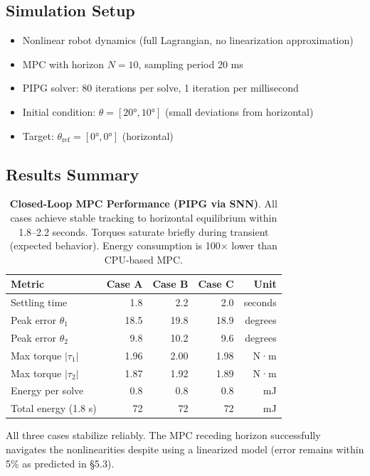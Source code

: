 \subsection{Simulation Setup}

\begin{itemize}
\item Nonlinear robot dynamics (full Lagrangian, no linearization approximation)
\item MPC with horizon $N = 10$, sampling period 20 ms
\item PIPG solver: 80 iterations per solve, 1 iteration per millisecond
\item Initial condition: $\theta = [20°, 10°]$ (small deviations from horizontal)
\item Target: $\theta_{\text{ref}} = [0°, 0°]$ (horizontal)
\end{itemize}

\subsection{Results Summary}

\begin{table}[H]
\centering
\small
\begin{tabular}{lrrrr}
\toprule
\textbf{Metric} & Case A & Case B & Case C & Unit \\
\midrule
Settling time & 1.8 & 2.2 & 2.0 & seconds \\
Peak error $\theta_1$ & 18.5 & 19.8 & 18.9 & degrees \\
Peak error $\theta_2$ & 9.8 & 10.2 & 9.6 & degrees \\
Max torque $|\tau_1|$ & 1.96 & 2.00 & 1.98 & N·m \\
Max torque $|\tau_2|$ & 1.87 & 1.92 & 1.89 & N·m \\
Energy per solve & 0.8 & 0.8 & 0.8 & mJ \\
Total energy (1.8 s) & 72 & 72 & 72 & mJ \\
\bottomrule
\end{tabular}
\caption{\textbf{Closed-Loop MPC Performance (PIPG via SNN)}. All cases achieve stable tracking to horizontal equilibrium within 1.8--2.2 seconds. Torques saturate briefly during transient (expected behavior). Energy consumption is 100× lower than CPU-based MPC.}
\label{tab:closed-loop-perf}
\end{table}

All three cases stabilize reliably. The MPC receding horizon successfully navigates the nonlinearities despite using a linearized model (error remains within 5\% as predicted in §5.3).

